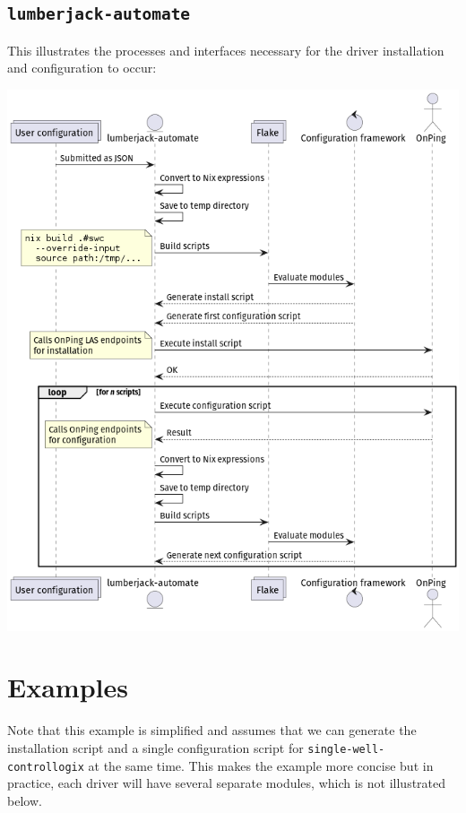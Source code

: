 \documentclass[11pt]{article}
\begin{document}
\subsection*{\texttt{lumberjack-automate}}
\label{sec:org56ea7fc}
This illustrates the processes and interfaces necessary for the driver installation and configuration to occur:
\begin{center}
\includegraphics[width=.9\linewidth]{./automate.png}
\end{center}
\section*{Examples}
\label{sec:org43af963}
Note that this example is simplified and assumes that we can generate the installation script and a single configuration script for \texttt{single-well-controllogix} at the same time. This makes the example more concise but in practice, each driver will have several separate modules, which is not illustrated below.
\end{document}
